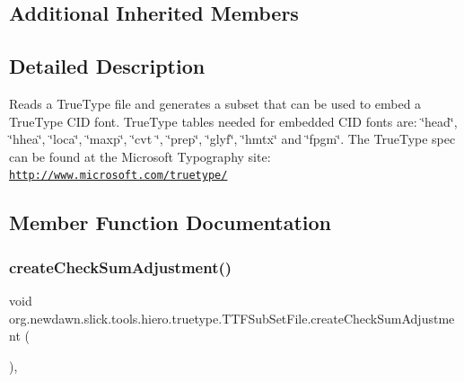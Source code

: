 \subsection*{Additional Inherited Members}


\subsection{Detailed Description}
Reads a True\+Type file and generates a subset that can be used to embed a True\+Type C\+ID font. True\+Type tables needed for embedded C\+ID fonts are\+: \char`\"{}head\char`\"{}, \char`\"{}hhea\char`\"{}, \char`\"{}loca\char`\"{}, \char`\"{}maxp\char`\"{}, \char`\"{}cvt \char`\"{}, \char`\"{}prep\char`\"{}, \char`\"{}glyf\char`\"{}, \char`\"{}hmtx\char`\"{} and \char`\"{}fpgm\char`\"{}. The True\+Type spec can be found at the Microsoft Typography site\+: \href{http://www.microsoft.com/truetype/}{\tt http\+://www.\+microsoft.\+com/truetype/} 

\subsection{Member Function Documentation}
\mbox{\label{classorg_1_1newdawn_1_1slick_1_1tools_1_1hiero_1_1truetype_1_1_t_t_f_sub_set_file_a4e488d6cb27400de20b0a21592e55701}} 
\subsubsection{\texorpdfstring{create\+Check\+Sum\+Adjustment()}{createCheckSumAdjustment()}}
{\footnotesize\ttfamily void org.\+newdawn.\+slick.\+tools.\+hiero.\+truetype.\+T\+T\+F\+Sub\+Set\+File.\+create\+Check\+Sum\+Adjustment (\begin{DoxyParamCaption}{ }\end{DoxyParamCaption})\hspace{0.3cm}{\ttfamily [inline]}, {\ttfamily [private]}}


